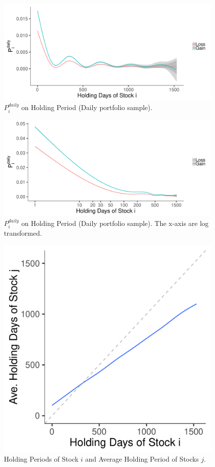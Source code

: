 \documentclass[11pt, a4paper]{article}
\begin{document}
\begin{appendices}
\begin{figure}[H]
	\centering
	\includegraphics[width=0.8\columnwidth]{barc_schedule_on_holding_days.pdf}
	\caption{$P^{daily}_{i}$ on Holding Period (Daily portfolio sample).}
	\label{figure:schedule_holding_days}
\end{figure}

\begin{figure}[H]
	\centering
	\includegraphics[width=0.8\columnwidth]{barc_schedule_on_holding_days_log.pdf}
	\caption{$P^{daily}_{i}$ on Holding Period (Daily portfolio sample). The x-axis are log transformed.}
	\label{figure:schedule_holding_days_log}
\end{figure}


\begin{figure}[H]
	\centering
	\includegraphics[width=0.6\columnwidth]{barc_holding_days_i_j.pdf}
	\caption{Holding Periods of Stock $i$ and Average Holding Period of Stocks $j$.}
	\label{figure:holding_days_i_j}
\end{figure}



\end{appendices}
\end{document}
